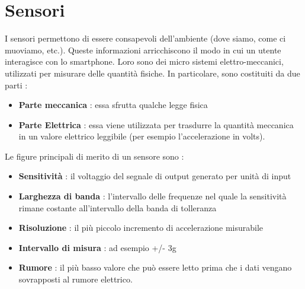 \documentclass[12pt]{report}
\begin{document}
\chapter{Sensori}
I sensori permettono di essere consapevoli dell'ambiente (dove siamo, come ci muoviamo, etc.). Queste informazioni arricchiscono il modo in cui un utente interagisce con lo smartphone. Loro sono dei micro sistemi elettro-meccanici, utilizzati per misurare delle quantità fisiche. In particolare, sono costituiti da due parti :
\begin{itemize}
\item \textbf{Parte meccanica} : essa sfrutta qualche legge fisica
\item \textbf{Parte Elettrica} : essa viene utilizzata per trasdurre la quantità meccanica in un valore elettrico leggibile (per esempio l'accelerazione in volts).
\end{itemize}
Le figure principali di merito di un sensore sono :
\begin{itemize}
\item \textbf{Sensitività} : il voltaggio del segnale di output generato per unità di input
\item \textbf{Larghezza di banda} : l'intervallo delle frequenze nel quale la sensitività rimane costante all'intervallo della banda di tolleranza
\item \textbf{Risoluzione} : il più piccolo incremento di accelerazione misurabile
\item \textbf{Intervallo di misura} : ad esempio +/- 3g
\item \textbf{Rumore} : il più basso valore che può essere letto prima che i dati vengano sovrapposti al rumore elettrico.
\end{itemize}
\end{document}
